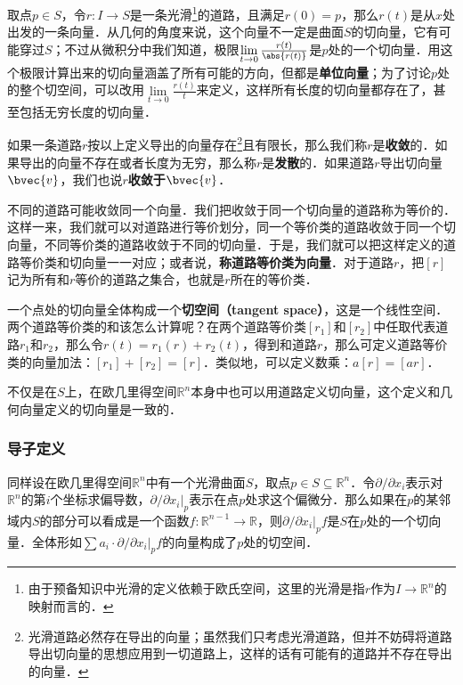 取点$p\in S$，令$r:I\rightarrow S$是一条光滑\footnote{由于预备知识中光滑的定义依赖于欧氏空间，这里的光滑是指$r$作为$I\rightarrow\mathbb{R}^n$的映射而言的．}的道路，且满足$r(0)=p$，那么$r(t)$是从$x$处出发的一条向量．从几何的角度来说，这个向量不一定是曲面$S$的切向量，它有可能穿过$S$；不过从微积分中我们知道，极限$\lim\limits_{t\rightarrow 0}\frac{r(t)}{\abs{r(t)}}$是$p$处的一个切向量．用这个极限计算出来的切向量涵盖了所有可能的方向，但都是\textbf{单位向量}；为了讨论$p$处的整个切空间，可以改用$\lim\limits_{t\rightarrow 0}\frac{r(t)}{t}$来定义，这样所有长度的切向量都存在了，甚至包括无穷长度的切向量．

如果一条道路$r$按以上定义导出的向量存在\footnote{光滑道路必然存在导出的向量；虽然我们只考虑光滑道路，但并不妨碍将道路导出切向量的思想应用到一切道路上，这样的话有可能有的道路并不存在导出的向量．}且有限长，那么我们称$r$是\textbf{收敛}的．如果导出的向量不存在或者长度为无穷，那么称$r$是\textbf{发散}的．如果道路$r$导出切向量$\bvec{v}$，我们也说$r$\textbf{收敛于}$\bvec{v}$．

不同的道路可能收敛同一个向量．我们把收敛于同一个切向量的道路称为等价的．这样一来，我们就可以对道路进行等价划分，同一个等价类的道路收敛于同一个切向量，不同等价类的道路收敛于不同的切向量．于是，我们就可以把这样定义的道路等价类和切向量一一对应；或者说，\textbf{称道路等价类为向量}．对于道路$r$，把$[r]$记为所有和$r$等价的道路之集合，也就是$r$所在的等价类．

一个点处的切向量全体构成一个\textbf{切空间（tangent space）}，这是一个线性空间．两个道路等价类的和该怎么计算呢？在两个道路等价类$[r_1]$和$[r_2]$中任取代表道路$r_1$和$r_2$，那么令$r(t)=r_1(r)+r_2(t)$，得到和道路$r$，那么可定义道路等价类的向量加法：$[r_1]+[r_2]=[r]$．类似地，可以定义数乘：$a[r]=[ar]$．

不仅是在$S$上，在欧几里得空间$\mathbb{R}^n$本身中也可以用道路定义切向量，这个定义和几何向量定义的切向量是一致的．

\subsubsection{导子定义}

同样设在欧几里得空间$\mathbb{R}^n$中有一个光滑曲面$S$，取点$p\in S\subseteq\mathbb{R}^n$．令$\partial/\partial x_i$表示对$\mathbb{R}^n$的第$i$个坐标求偏导数，$\partial/\partial x_i|_{p}$表示在点$p$处求这个偏微分．那么如果在$p$的某邻域内$S$的部分可以看成是一个函数$f:\mathbb{R}^{n-1}\rightarrow\mathbb{R}$，则$\partial/\partial x_i|_{p}f$是$S$在$p$处的一个切向量．全体形如$\sum a_i\cdot\partial/\partial x_i|_{p}f$的向量构成了$p$处的切空间．

